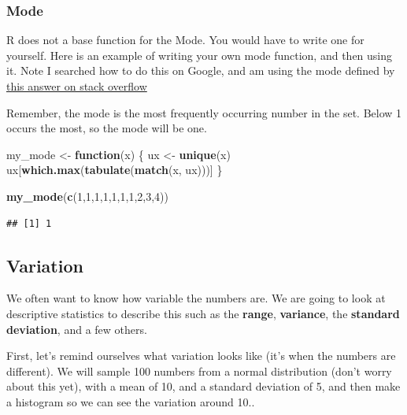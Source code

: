 \documentclass[]{book}
\newenvironment{Shaded}{\begin{snugshade}}{\end{snugshade}}
\newcommand{\KeywordTok}[1]{\textcolor[rgb]{0.13,0.29,0.53}{\textbf{#1}}}
\newcommand{\DecValTok}[1]{\textcolor[rgb]{0.00,0.00,0.81}{#1}}
\newcommand{\StringTok}[1]{\textcolor[rgb]{0.31,0.60,0.02}{#1}}
\newcommand{\ControlFlowTok}[1]{\textcolor[rgb]{0.13,0.29,0.53}{\textbf{#1}}}
\newcommand{\NormalTok}[1]{#1}
\begin{document}
\subsubsection{Mode}\label{mode}

R does not a base function for the Mode. You would have to write one for
yourself. Here is an example of writing your own mode function, and then
using it. Note I searched how to do this on Google, and am using the
mode defined by
\href{https://stackoverflow.com/questions/2547402/is-there-a-built-in-function-for-finding-the-mode}{this
answer on stack overflow}

Remember, the mode is the most frequently occurring number in the set.
Below 1 occurs the most, so the mode will be one.

\begin{Shaded}
\begin{Highlighting}[]
\NormalTok{my_mode <-}\StringTok{ }\ControlFlowTok{function}\NormalTok{(x) \{}
\NormalTok{  ux <-}\StringTok{ }\KeywordTok{unique}\NormalTok{(x)}
\NormalTok{  ux[}\KeywordTok{which.max}\NormalTok{(}\KeywordTok{tabulate}\NormalTok{(}\KeywordTok{match}\NormalTok{(x, ux)))]}
\NormalTok{\}}

\KeywordTok{my_mode}\NormalTok{(}\KeywordTok{c}\NormalTok{(}\DecValTok{1}\NormalTok{,}\DecValTok{1}\NormalTok{,}\DecValTok{1}\NormalTok{,}\DecValTok{1}\NormalTok{,}\DecValTok{1}\NormalTok{,}\DecValTok{1}\NormalTok{,}\DecValTok{1}\NormalTok{,}\DecValTok{2}\NormalTok{,}\DecValTok{3}\NormalTok{,}\DecValTok{4}\NormalTok{))}
\end{Highlighting}
\end{Shaded}

\begin{verbatim}
## [1] 1
\end{verbatim}

\subsection{Variation}\label{variation}

We often want to know how variable the numbers are. We are going to look
at descriptive statistics to describe this such as the \textbf{range},
\textbf{variance}, the \textbf{standard deviation}, and a few others.

First, let's remind ourselves what variation looks like (it's when the
numbers are different). We will sample 100 numbers from a normal
distribution (don't worry about this yet), with a mean of 10, and a
standard deviation of 5, and then make a histogram so we can see the
variation around 10..
\end{document}
